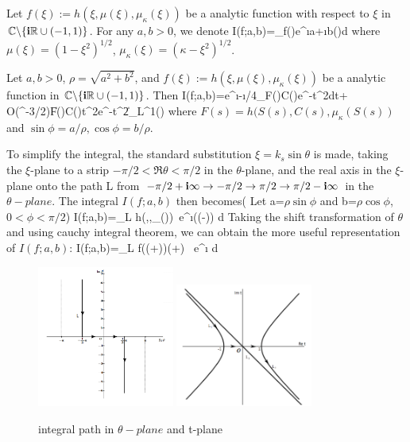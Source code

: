 \documentclass[12pt]{iopart}
\begin{document}
Let $f(\xi):=h(\xi,\mu(\xi),\mu_\kappa(\xi))$ be a analytic function with respect to $\xi$ in ${\mathbb{C}}\backslash\{\mathbf{i}{\mathbb{R}}\cup(-1,1)\}$. For any $a,b>0$, we denote
\ben
I(f;a,b)=\int_{\R}f(\xi)e^{\i a\xi+\i b\mu(\xi)}d\xi
\een
where $\mu(\xi)=(1-\xi^2)^{1/2}$, $\mu_\kappa(\xi)=(\kappa-\xi^2)^{1/2}$.
\begin{lem}\label{new_station_phase}
	Let $a,b >0$, $\rho=\sqrt{a^2+b^2}$, and $f(\xi):=h(\xi,\mu(\xi),\mu_\kappa(\xi))$ be a analytic function in ${\mathbb{C}}\backslash\{\mathbf{i}{\mathbb{R}}\cup(-1,1)\}$. Then 
	\ben\hspace{-2.5cm}
	I(f;a,b)=e^{\i\rho-\i\pi/4}\int_{\R}F()C()e^{-t^2}dt+
	O(\rho^{-3/2})\|F()C()t^2e^{-t^2}\|_{L^1(\R)}
	\een
	where $F(s)= h(S(s),C(s),\mu_\kappa(S(s))$ and $\sin\phi=a/\rho,\cos\phi=b/\rho$.
\end{lem}
\debproof
 To simplify the integral, the standard substitution $\xi=k_s\sin \theta$ is made, taking the $\xi$-plane to a strip $-\pi/2<\Re \theta <\pi/2$ in the $\theta$-plane, and the real axis in the $\xi$-plane onto the path L from $-\pi/2+\mathbf{i}\infty\rightarrow-\pi/2\rightarrow\pi/2\rightarrow\pi/2-\mathbf{i}\infty$ in the $\theta-plane$. The integral $I(f;a,b)$ then becomes( Let a=$\rho \sin\phi$  and b=$\rho\cos\phi$, $0<\phi<\pi/2$)
\be
 I(f;a,b)=\int_L h(\sin \theta,\cos \theta,\mu_\kappa(\sin \theta))\cos \theta \ e^{\i\rho(\cos (\theta-\phi))} d\theta
\ee
Taking the shift transformation of $\theta$ and using cauchy integral theorem, we can obtain the more useful representation of $I(f;a,b)$:
\be
I(f;a,b)=\int_L f(\sin (\theta+\phi))\cos (\theta+\phi) \ e^{\i\rho\cos \theta} d\theta
\ee
\begin{figure}
	\centering
	\includegraphics[width=0.4\textwidth]{./graphic/transform_th.png}
	\includegraphics[width=0.4\textwidth]{./graphic/transform_t.png}

	\caption{integral path in $\theta-plane$ and t-plane  }\label{transform_t}
\end{figure}
\end{document}
